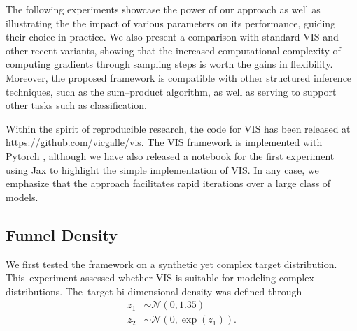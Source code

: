 
{The following experiments showcase the power of our 
approach as well as illustrating the the impact of various parameters on its performance, guiding their 
choice in practice. We 
also present a comparison with standard VIS
and other recent variants, showing that the increased computational complexity of computing
gradients through sampling steps is worth the gains in flexibility.
Moreover, the proposed framework is compatible with other structured inference techniques, such as the sum--product algorithm, as well as serving to support other tasks such as  classification}.

Within the spirit of reproducible research, 
the code for VIS has been released at %
\url{https://github.com/vicgalle/vis}. 
The VIS framework is implemented with Pytorch \cite{paszke2017automatic}, although we have also released a notebook for the first experiment using Jax to highlight the simple implementation of VIS.
In any case, we emphasize that the approach facilitates 
rapid iterations over a large class of models. 

\subsection{Funnel Density}

We first tested the framework on a synthetic yet complex target distribution. This~experiment assessed whether VIS is
suitable for modeling complex distributions. The~target bi-dimensional density was defined through
\begin{align*}
    z_1 &\sim \mathcal{N}(0, 1.35) \\
    z_2 &\sim \mathcal{N}(0, \exp(z_1)).
\end{align*}



